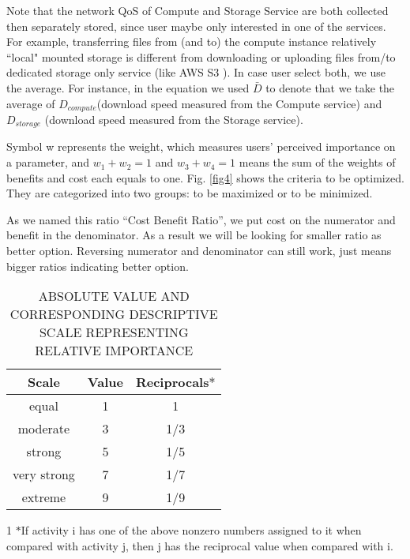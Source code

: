 \documentclass[journal]{IEEEtran}
\begin{document}
Note that the network QoS of Compute and Storage Service are both collected then separately stored, since user maybe only interested in one of the services. For example, transferring files from (and to) the compute instance relatively ``local"  mounted storage is different from downloading or uploading files from/to dedicated storage only service (like AWS S3 \cite{S3}). In case user select both, we use the average. For instance, in the equation we used $\bar D$ to denote that we take the average of $D_{compute}$(download speed measured from the Compute service) and $D_{storage}$  (download speed measured from the Storage service).

Symbol w represents the weight, which measures users' perceived importance on a parameter, and $w_{1}+ w_{2}=1$ and $w_3+ w_4=1$ means the sum of the weights of benefits and cost each equals to one. Fig. \ref{fig4} shows the criteria to be optimized. They are categorized into two groups: to be maximized or to be minimized.

As we named this ratio ``Cost Benefit Ratio'', we put cost on the numerator and benefit in the denominator. As a result we will be looking for smaller ratio as better option. Reversing numerator and denominator can still work, just means bigger ratios indicating better option.

\begin{table}[!h]
\begin{center}\caption{ABSOLUTE VALUE AND CORRESPONDING DESCRIPTIVE SCALE REPRESENTING RELATIVE IMPORTANCE} \label{table:scale}
\begin{tabular}{|c|c|c|}
\hline
\textbf{Scale }&  \textbf{Value } & Reciprocals\tnote{1}$*$ \\
\hline equal & 1 & 1\\
\hline moderate & 3 & 1/3 \\
\hline strong & 5 & 1/5 \\
\hline very strong & 7 & 1/7 \\
\hline extreme & 9 & 1/9\\
\hline
\end{tabular}
\begin{tablenotes}
  \item[1] $*$If activity i has one of the above nonzero numbers assigned to it when compared with activity j, then j has the reciprocal value when compared with i.
\end{tablenotes}

\end{center}
\end{table}
\end{document}
